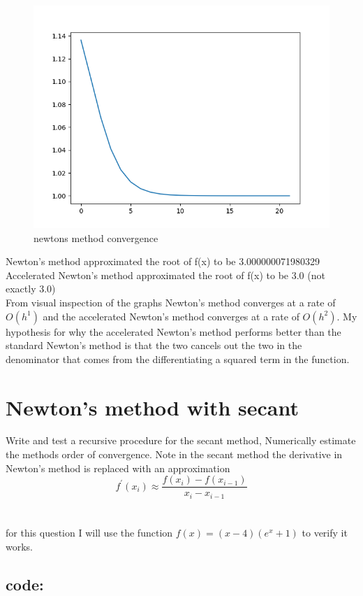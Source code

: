 \documentclass{article}
\begin{document}
	\begin{figure}[hbt!]
		\centering
		\includegraphics[width=.75\linewidth]{newtons_alpha.png}
		\caption{newtons method convergence}
		\label{fig: newtons method convergence}
	\end{figure}
Newton's method approximated the root of f(x) to be 3.000000071980329\\
Accelerated Newton's method approximated the root of f(x) to be 3.0 (not exactly 3.0)\\
From visual inspection of the graphs Newton's method converges at a rate of $O(h^1)$
and the accelerated Newton's method converges at a rate of $O(h^2)$. My hypothesis for why the accelerated Newton's method performs better than the standard Newton's method is that the two cancels out the two in the denominator that comes from the differentiating a squared term in the function. 
\pagebreak

\section{Newton's method with secant}
Write and test a recursive procedure for the secant method, Numerically estimate the methods order of convergence. Note in the secant method the derivative in Newton's method is replaced with an approximation 
$$f^\prime(x_i) \approx  \frac{f(x_i)-f(x_{i-1})}{x_i-x_{i-1}}$$
\\\\
for this question I will use the function $f(x) = (x - 4)(e^x + 1)$ to verify it works.


\subsection*{code:}

\end{document}
